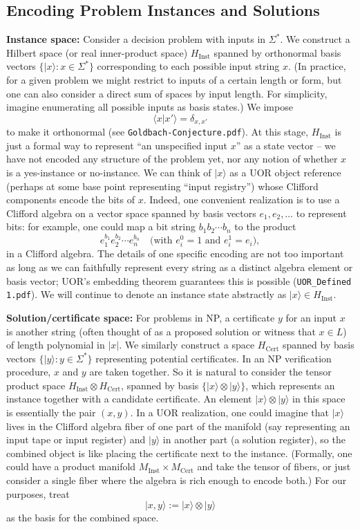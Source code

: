 \documentclass[11pt]{article}
\begin{document}
\subsection{Encoding Problem Instances and Solutions}
\textbf{Instance space:} Consider a decision problem with inputs in \(\Sigma^*\). We construct a Hilbert space (or real inner-product space) \(H_{\text{Inst}}\) spanned by orthonormal basis vectors \(\{|x\rangle: x \in \Sigma^*\}\) corresponding to each possible input string \(x\). (In practice, for a given problem we might restrict to inputs of a certain length or form, but one can also consider a direct sum of spaces by input length. For simplicity, imagine enumerating all possible inputs as basis states.) We impose 
\[
\langle x | x'\rangle = \delta_{x,x'}
\]
to make it orthonormal (see \texttt{Goldbach-Conjecture.pdf}). At this stage, \(H_{\text{Inst}}\) is just a formal way to represent “an unspecified input \(x\)” as a state vector -- we have not encoded any structure of the problem yet, nor any notion of whether \(x\) is a yes-instance or no-instance. We can think of \(|x\rangle\) as a UOR object reference (perhaps at some base point representing “input registry”) whose Clifford components encode the bits of \(x\). Indeed, one convenient realization is to use a Clifford algebra on a vector space spanned by basis vectors \(e_1, e_2, \dots\) to represent bits: for example, one could map a bit string \(b_1b_2\cdots b_n\) to the product
\[
e_1^{b_1} e_2^{b_2}\cdots e_n^{b_n} \quad \text{(with \(e_i^0 = 1\) and \(e_i^1 = e_i\))},
\]
in a Clifford algebra. The details of one specific encoding are not too important as long as we can faithfully represent every string as a distinct algebra element or basis vector; UOR’s embedding theorem guarantees this is possible (\texttt{UOR\_Defined 1.pdf}). We will continue to denote an instance state abstractly as \(|x\rangle \in H_{\text{Inst}}\).

\textbf{Solution/certificate space:} For problems in NP, a certificate \(y\) for an input \(x\) is another string (often thought of as a proposed solution or witness that \(x\in L\)) of length polynomial in \(|x|\). We similarly construct a space \(H_{\text{Cert}}\) spanned by basis vectors \(\{|y\rangle: y \in \Sigma^*\}\) representing potential certificates. In an NP verification procedure, \(x\) and \(y\) are taken together. So it is natural to consider the tensor product space \(H_{\text{Inst}} \otimes H_{\text{Cert}}\), spanned by basis \(\{|x\rangle \otimes |y\rangle\}\), which represents an instance together with a candidate certificate. An element \(|x\rangle \otimes |y\rangle\) in this space is essentially the pair \((x,y)\). In a UOR realization, one could imagine that \(|x\rangle\) lives in the Clifford algebra fiber of one part of the manifold (say representing an input tape or input register) and \(|y\rangle\) in another part (a solution register), so the combined object is like placing the certificate next to the instance. (Formally, one could have a product manifold \(M_{\text{Inst}} \times M_{\text{Cert}}\) and take the tensor of fibers, or just consider a single fiber where the algebra is rich enough to encode both.) For our purposes, treat
\[
|x,y\rangle := |x\rangle\otimes|y\rangle
\]
as the basis for the combined space.
\end{document}
